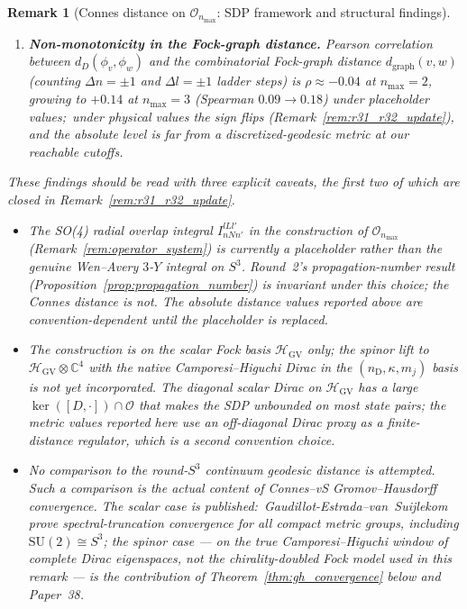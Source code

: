 \documentclass[11pt]{article}
\newtheorem{remark}{Remark}
\begin{document}
\begin{remark}[Connes distance on $\mathcal{O}_{n_{\max}}$: SDP framework
and structural findings]
\begin{enumerate}
\item \textbf{Non-monotonicity in the Fock-graph distance.}  Pearson
   correlation between $d_D(\phi_v, \phi_w)$ and the combinatorial
   Fock-graph distance $d_{\mathrm{graph}}(v, w)$ (counting $\Delta n =
   \pm 1$ and $\Delta l = \pm 1$ ladder steps) is $\rho \approx -0.04$
   at $n_{\max} = 2$, growing to $+0.14$ at $n_{\max} = 3$ (Spearman
   $0.09 \to 0.18$) under placeholder values;\ under physical values the
   sign flips (Remark~\ref{rem:r31_r32_update}), and the absolute level
   is far from a discretized-geodesic metric at our reachable cutoffs.
\end{enumerate}

These findings should be read with three explicit caveats, the
first two of which are closed in Remark~\ref{rem:r31_r32_update}.

\begin{itemize}
\item The SO(4) radial overlap integral $I_{n N n'}^{l L l'}$ in the
   construction of $\mathcal{O}_{n_{\max}}$
   (Remark~\ref{rem:operator_system}) is currently a placeholder rather
   than the genuine Wen--Avery $3$-$Y$ integral on $S^3$.
   Round~2's propagation-number result
   (Proposition~\ref{prop:propagation_number}) is invariant under this
   choice; the Connes distance is not.  The absolute distance values
   reported above are convention-dependent until the placeholder is
   replaced.

\item The construction is on the scalar Fock basis $\mathcal{H}_{\mathrm{GV}}$
   only; the spinor lift to $\mathcal{H}_{\mathrm{GV}} \otimes
   \mathbb{C}^4$ with the native Camporesi--Higuchi Dirac in the
   $(n_{\mathrm{D}}, \kappa, m_j)$ basis is not yet incorporated.  The
   diagonal scalar Dirac on $\mathcal{H}_{\mathrm{GV}}$ has a large
   $\ker([D, \cdot]) \cap \mathcal{O}$ that makes the SDP unbounded on
   most state pairs; the metric values reported here use an
   off-diagonal Dirac proxy as a finite-distance regulator, which is a
   second convention choice.

\item No comparison to the round-$S^3$ continuum geodesic distance is
   attempted.  Such a comparison is the actual content of Connes--vS
   Gromov--Hausdorff convergence.  The scalar case is published:\
   Gaudillot-Estrada--van~Suijlekom~\cite{gaudillot_estrada_vs2025}
   prove spectral-truncation convergence for all compact metric
   groups, including $\mathrm{SU}(2) \cong S^3$; the spinor case ---
   on the true Camporesi--Higuchi window of complete Dirac eigenspaces,
   not the chirality-doubled Fock model used in this remark --- is the
   contribution of Theorem~\ref{thm:gh_convergence} below and Paper~38.
\end{itemize}


\end{remark}
\end{document}
